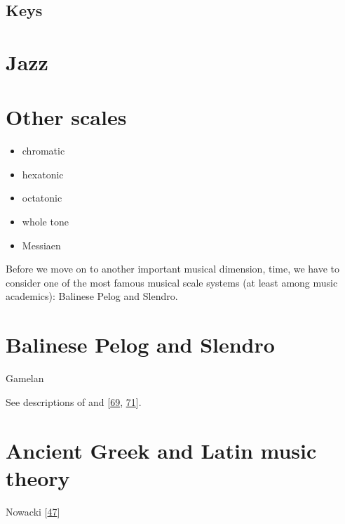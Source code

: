 \documentclass[letterpaper,10pt,english]{sphinxmanual}
\begin{document}
\subsection{Keys}
\label{\detokenize{2_scales_modes:keys}}

\section{Jazz}
\label{\detokenize{2_scales_modes:jazz}}

\section{Other scales}
\label{\detokenize{2_scales_modes:other-scales}}\begin{itemize}
\item {} 
\sphinxAtStartPar
chromatic

\item {} 
\sphinxAtStartPar
hexatonic

\item {} 
\sphinxAtStartPar
octatonic

\item {} 
\sphinxAtStartPar
whole tone

\item {} 
\sphinxAtStartPar
Messiaen

\end{itemize}

\sphinxAtStartPar
Before we move on to another important musical dimension,
time, we have to consider
one of the most famous musical scale systems
(at least among music academics): Balinese Pelog and Slendro.


\section{Balinese Pelog and Slendro}
\label{\detokenize{2_scales_modes:balinese-pelog-and-slendro}}
\sphinxAtStartPar
Gamelan

\sphinxAtStartPar
See descriptions of 
and 
{[}\hyperlink{cite.8_bibliography:id37}{69}, \hyperlink{cite.8_bibliography:id38}{71}{]}.


\section{Ancient Greek and Latin music theory}
\label{\detokenize{2_scales_modes:ancient-greek-and-latin-music-theory}}
\sphinxAtStartPar
Nowacki {[}\hyperlink{cite.8_bibliography:id35}{47}{]}
\end{document}
